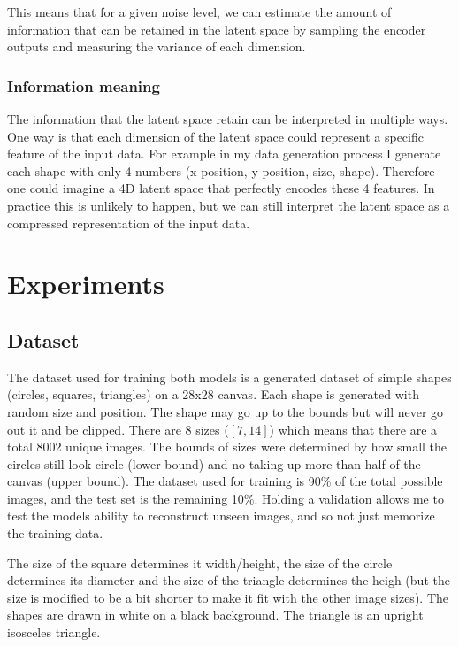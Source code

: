 \documentclass[conference,a4paper]{IEEEtran}
\begin{document}
This means that for a given noise level, we can estimate the amount of information that can be retained in the latent space by sampling the encoder outputs and measuring the variance of each dimension.

\subsubsection{Information meaning}

The information that the latent space retain can be interpreted in multiple ways. One way is that each dimension of the latent space could represent a specific feature of the input data. For example in my data generation process I generate each shape with only 4 numbers (x position, y position, size, shape). Therefore one could imagine a 4D latent space that perfectly encodes these 4 features. In practice this is unlikely to happen, but we can still interpret the latent space as a compressed representation of the input data.

\section{Experiments}

\subsection{Dataset}

The dataset used for training both models is a generated dataset of simple shapes (circles, squares, triangles) on a 28x28 canvas. Each shape is generated with random size and position. The shape may go up to the bounds but will never go out it and be clipped. There are 8 sizes ($[7,14]$) which means that there are a total 8002 unique images. The bounds of sizes were determined by how small the circles still look circle (lower bound) and no taking up more than half of the canvas (upper bound). The dataset used for training is 90\% of the total possible images, and the test set is the remaining 10\%. Holding a validation allows me to test the models ability to reconstruct unseen images, and so not just memorize the training data.

The size of the square determines it width/height, the size of the circle determines its diameter and the size of the triangle determines the heigh (but the size is modified to be a bit shorter to make it fit with the other image sizes). The shapes are drawn in white on a black background. The triangle is an upright isosceles triangle.
\end{document}
